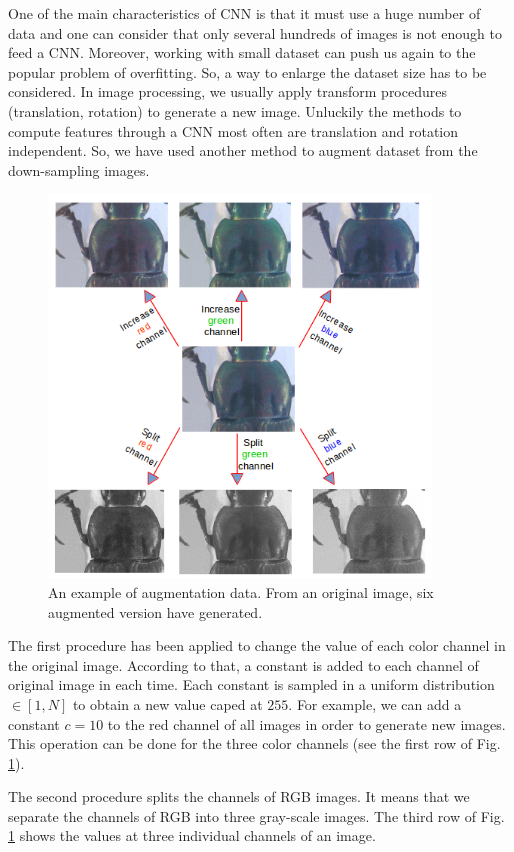 \documentclass[12pt,a4paper]{article}
\begin{document}
One of the main characteristics of CNN is that it must use
a huge number of data and one can consider that only several
hundreds of images is not enough to feed a CNN. Moreover,
working with small dataset can push us again to the popular problem of overfitting. So, a way to enlarge the dataset size
has to be considered. In image processing, we usually apply
transform procedures (translation, rotation) to generate a new
image. Unluckily the methods to compute features through a
CNN most often are translation and rotation independent. So, we have used another method to augment dataset from the down-sampling images. 

\begin{figure}[h]
	\centering
	\includegraphics[height=4.0in]{images/cnn_newdatasize/data_aug}
	\caption{An example of augmentation data. From an original image, six augmented version have generated.}
	\label{figdataaug}
\end{figure}

The first procedure has been applied to change the value of
each color channel in the original image. According to that,
a constant is added to each channel of original image in each time. Each constant is sampled in a uniform distribution $\in [1,N] $ to obtain a new value caped at $255$. For
example, we can add a constant $c = 10$ to the red channel of
all images in order to generate new images. This operation can
be done for the three color channels (see the first row of Fig. \ref{figdataaug}).

The second procedure splits the channels of RGB images. It means that we separate the channels of RGB into three gray-scale images. The third row of Fig. \ref{figdataaug} shows the values at three individual channels of an image.
\end{document}

